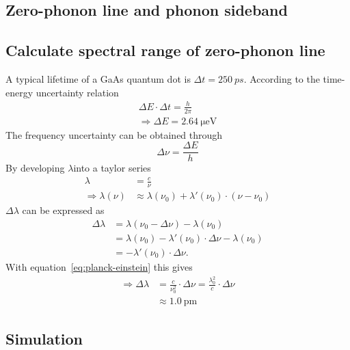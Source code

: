 \subsection{Zero-phonon line and phonon sideband}


\subsection{Calculate spectral range of zero-phonon line}
A typical lifetime of a GaAs quantum dot is $\Delta t = 250~ps$.
According to the time-energy uncertainty relation
\begin{align}
\Delta E \cdot \Delta t = \frac{h}{2 \pi}\\
\Rightarrow \Delta E = \SI{2.64}{\micro \electronvolt}
\end{align}
The frequency uncertainty can be obtained through
\begin{equation}
\Delta \nu = \frac{\Delta E}{h}
\end{equation}
By developing $\lambda$into a taylor series
\begin{align}
\label{eq:planck-einstein}
\lambda &= \frac{c}{\nu}\\
\Rightarrow \lambda(\nu) &\approx \lambda(\nu_0) + \lambda'(\nu_0) \cdot (\nu - \nu_0)
\end{align}
$\Delta \lambda$ can be expressed as
\begin{align}
\Delta \lambda &= \lambda(\nu_0 - \Delta \nu) - \lambda(\nu_0)\\
 &= \lambda(\nu_0) - \lambda'(\nu_0)\cdot\Delta \nu - \lambda(\nu_0)\\
 &= - \lambda'(\nu_0)\cdot \Delta \nu.
\end{align}
With equation~\eqref{eq:planck-einstein} this gives
\begin{align}
\Rightarrow \Delta \lambda &= \frac{c}{\nu_0^2} \cdot \Delta \nu = \frac{\lambda_0^2}{c}\cdot\Delta \nu\\
\label{eq:zero-phonon-theoretical-limit}
&\approx \SI{1.0}{\pico \metre}
\end{align}

\subsection{Simulation}

